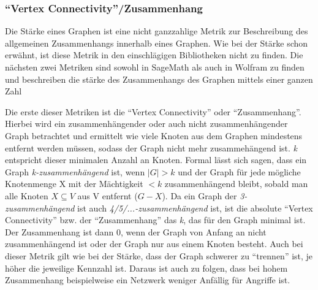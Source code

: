 \documentclass[a4paper,12pt,ngerman,chapterprefix=false,listof=totoc,bibliography=totoc]{scrreprt}
\begin{document}
\subsubsection*{"`Vertex Connectivity"'/Zusammenhang}
{
Die Stärke eines Graphen ist eine nicht ganzzahlige Metrik zur Beschreibung des allgemeinen Zusammenhangs innerhalb eines Graphen. Wie bei der Stärke schon erwähnt, ist diese Metrik in den einschlägigen Bibliotheken nicht zu finden. Die nächsten zwei Metriken sind sowohl in SageMath als auch in Wolfram zu finden und beschreiben die stärke des Zusammenhangs des Graphen mittels einer ganzen Zahl \cite{sagemath_graph_2020,wolfram_graph_2020}

Die erste dieser Metriken ist die "`Vertex Connectivity"' oder "`Zusammenhang"'. Hierbei wird ein zusammenhängender oder auch nicht zusammenhängender Graph betrachtet und ermittelt wie viele Knoten aus dem Graphen mindestens entfernt werden müssen, sodass der Graph nicht mehr zusammehängend ist. \textit{k} entspricht dieser minimalen Anzahl an Knoten. Formal lässt sich sagen, dass ein Graph \textit{k-zusammenhängend} ist, wenn \(\vert G\vert > k\) und der Graph für jede mögliche Knotenmenge X mit der Mächtigkeit \(< k\) zusammenhängend bleibt, sobald man alle Knoten \(X\subseteq V\) aus V entfernt (\(G - X\)). Da ein Graph der \textit{3-zusammenhängend} ist auch \textit{4/5/...-zusammenhängend} ist, ist die absolute "`Vertex Connectivity"' bzw.  der "`Zusammenhang"' das \textit{k}, das für den Graph minimal ist. Der Zusammenhang ist dann 0, wenn der Graph von Anfang an nicht zusammenhängend ist oder der Graph nur aus einem Knoten besteht. \cite{diestel_graphentheorie_2000} Auch bei dieser Metrik gilt wie bei der Stärke, dass der Graph schwerer zu "`trennen"' ist, je höher die jeweilige Kennzahl ist. Daraus ist auch zu folgen, dass bei hohem Zusammenhang beispielweise ein Netzwerk weniger Anfällig für Angriffe ist.

}
\end{document}
